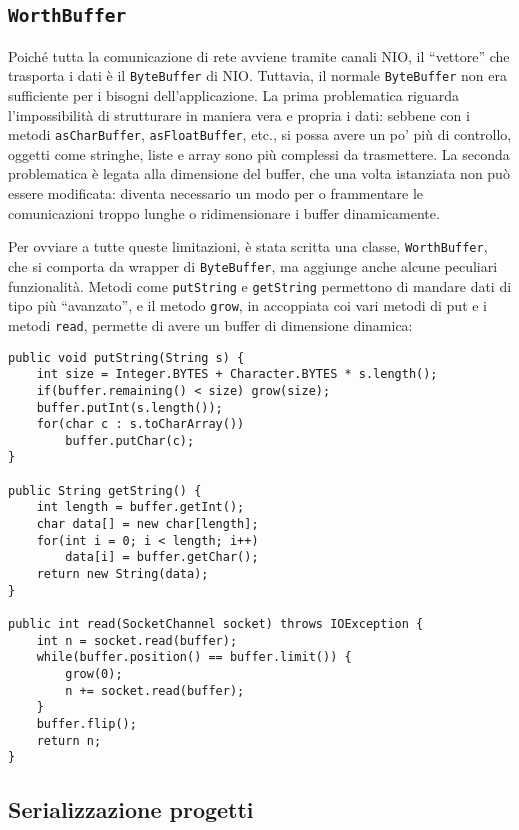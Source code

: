 \documentclass[a4paper,11pt] {article}
\begin{document}
\subsection*{\texttt{WorthBuffer}}

Poiché tutta la comunicazione di rete avviene tramite canali NIO, il ``vettore'' che trasporta i dati è il \texttt{ByteBuffer} di NIO. Tuttavia, il normale \texttt{ByteBuffer} non era sufficiente per i bisogni dell'applicazione. La prima problematica riguarda l'impossibilità di strutturare in maniera vera e propria i dati: sebbene con i metodi \texttt{asCharBuffer}, \texttt{asFloatBuffer}, etc., si possa avere un po' più di controllo, oggetti come stringhe, liste e array sono più complessi da trasmettere. La seconda problematica è legata alla dimensione del buffer, che una volta istanziata non può essere modificata: diventa necessario un modo per o frammentare le comunicazioni troppo lunghe o ridimensionare i buffer dinamicamente.

Per ovviare a tutte queste limitazioni, è stata scritta una classe, \texttt{WorthBuffer}, che si comporta da wrapper di \texttt{ByteBuffer}, ma aggiunge anche alcune peculiari funzionalità. Metodi come \texttt{putString} e \texttt{getString} permettono di mandare dati di tipo più ``avanzato'', e il metodo \texttt{grow}, in accoppiata coi vari metodi di put e i metodi \texttt{read}, permette di avere un buffer di dimensione dinamica:

\begin{verbatim}
public void putString(String s) {
	int size = Integer.BYTES + Character.BYTES * s.length();
	if(buffer.remaining() < size) grow(size);
	buffer.putInt(s.length());
	for(char c : s.toCharArray())
		buffer.putChar(c);
}

public String getString() {
	int length = buffer.getInt();
	char data[] = new char[length];
	for(int i = 0; i < length; i++)
		data[i] = buffer.getChar();
	return new String(data);
}

public int read(SocketChannel socket) throws IOException {
	int n = socket.read(buffer);
	while(buffer.position() == buffer.limit()) {
		grow(0);
		n += socket.read(buffer);
	}
	buffer.flip();
	return n;
}
\end{verbatim}

\subsection*{Serializzazione progetti}
\end{document}
